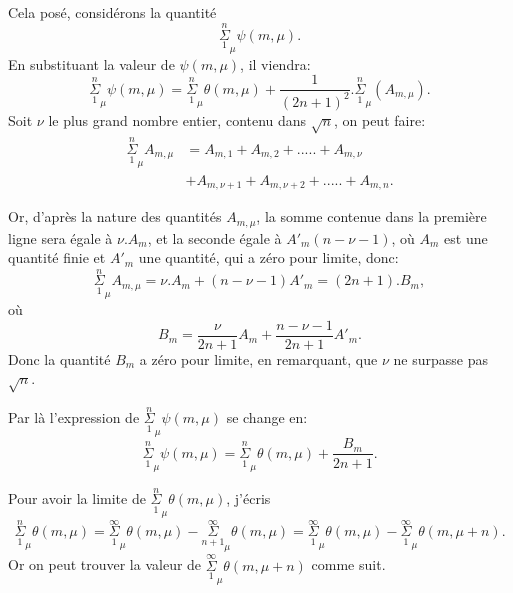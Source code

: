 \documentclass{article}
\begin{document}
Cela posé, considérons la quantité
\[ \overset{n}{\underset{1}{\Sigma}}_{\mu}\psi(m,\mu). \]
En substituant la valeur de $\psi(m,\mu)$, il viendra:
\[ \overset{n}{\underset{1}{\Sigma}}_{\mu}\psi(m,\mu)=\overset{n}{\underset{1}{\Sigma}}_{\mu}\theta(m,\mu)+\frac{1}{(2n+1)^{2}}.\overset{n}{\underset{1}{\Sigma}}_{\mu}(A_{m,\mu}). \tag{168.} \]
Soit $\nu$ le plus grand nombre entier, contenu dans $\sqrt{n}$, on peut faire:
\[ \begin{aligned}\overset{n}{\underset{1}{\Sigma}}_{\mu}A_{m,\mu}&=A_{m,1}+A_{m,2}+.....+A_{m,\nu}\\ &+A_{m,\nu+1}+A_{m,\nu+2}+.....+A_{m,n}.\end{aligned} \]

Or, d'après la nature des quantités $A_{m,\mu}$, la somme contenue dans la première ligne sera égale à $\nu.A_{m}$, et la seconde égale à $A'_{m}(n-\nu-1)$, où $A_{m}$ est une quantité finie et $A'_{m}$ une quantité, qui a zéro pour limite, donc:
\[ \overset{n}{\underset{1}{\Sigma}}_{\mu}A_{m,\mu}=\nu.A_{m}+(n-\nu-1)A'_{m}=(2n+1).B_{m}, \]
où
\[ B_{m}=\frac{\nu}{2n+1}A_{m}+\frac{n-\nu-1}{2n+1}A'_{m}. \]
Donc la quantité $B_{m}$ a zéro pour limite, en remarquant, que $\nu$ ne surpasse pas $\sqrt{n}$.

Par là l'expression de $\overset{n}{\underset{1}{\Sigma}}_{\mu}\psi(m,\mu)$ se change en:
\[ \overset{n}{\underset{1}{\Sigma}}_{\mu}\psi(m,\mu)=\overset{n}{\underset{1}{\Sigma}}_{\mu}\theta(m,\mu)+\frac{B_{m}}{2n+1}. \tag{169.} \]

Pour avoir la limite de $\overset{n}{\underset{1}{\Sigma}}_{\mu}\theta(m,\mu)$, j'écris
\[ \overset{n}{\underset{1}{\Sigma}}_{\mu}\theta(m,\mu)=\overset{\infty}{\underset{1}{\Sigma}}_{\mu}\theta(m,\mu)-\overset{\infty}{\underset{n+1}{\Sigma}}_{\mu}\theta(m,\mu)=\overset{\infty}{\underset{1}{\Sigma}}_{\mu}\theta(m,\mu)-\overset{\infty}{\underset{1}{\Sigma}}_{\mu}\theta(m,\mu+n). \]
Or on peut trouver la valeur de $\overset{\infty}{\underset{1}{\Sigma}}_{\mu}\theta(m,\mu+n)$ comme suit.

\end{document}
